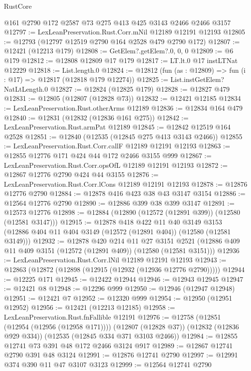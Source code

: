 \begin{lexlean}{RustCore}
\begin{coremodule}
    @161
    @2790
    @172
    @2587
    @73
    @275
    @413
    @425
    @3143
    @2466
    @2466
    @3157
@12797 := LexLeanPreservation.Rust.Corr.mNil @12189 @12191 @12193
@12805 := @12793 (@12797 @12519 @2790 @164 @2528 @479 @2790 @172)
@12807 := @12421 (@12213 @179)
@12808 := GetElem?.getElem?.{0, 0, 0}
@12809 := @6 @179
@12812 := @12808 @12809 @17 @179
@12817 := LT.lt.{0} @17 instLTNat @12229
@12818 := List.length.{0}
@12824 := @12812 (fun (as : @12809) => fun (i : @17) => @12817 (@12818 @179 @12274))
@12825 := List.instGetElem?NatLtLength.{0}
@12827 := @12824 (@12825 @179)
@12828 := @12827 @479
@12831 := @12805 (@12807 (@12828 @73))
@12832 := @12421 @12185
@12834 := LexLeanPreservation.Rust.otherArms @12189
@12836 := @12834 @164 @479
@12840 := @12831 (@12832 (@12836 @161 @275))
@12842 := LexLeanPreservation.Rust.armPat @12189
@12845 := @12842 @12519 @164 @2528
@12851 := @12840 (@12535 (@12845 @275 @413 @3143 @2466))
@12855 := LexLeanPreservation.Rust.Corr.callF @12189 @12191 @12193
@12863 := @12855 @12776 @171 @424 @44 @172 @2466 @3155 @999
@12867 := LexLeanPreservation.Rust.Corr.opsOfL @12189 @12191 @12193
@12872 := @12867 @12776 @2790 @424 @44 @3155
@12876 := LexLeanPreservation.Rust.Corr.lCons @12189 @12191 @12193
@12878 := @12876 @12776 @2790
@12884 := @12878 @416 @423 @38 @43 @3147 @3154
@12886 := @12564 @12776 @2790
@12890 := @12886 @399 @38 @399 @3147
@12891 := @12573 @12776
@12898 := @12884 (@12890 (@12572 (@12891 @399)) (@12580 (@12581 @3147)))
@12915 := @12878
    @418
    @422
    @11
    @40
    @3149
    @3153
    (@12886 @404 @11 @404 @3149 (@12572 (@12891 @404)) (@12580 (@12581 @3149)))
@12932 := @12878
    @420
    @214
    @11
    @27
    @3151
    @2521
    (@12886 @409 @11 @409 @3151 (@12572 (@12891 @409)) (@12580 (@12581 @3151)))
@12936 := LexLeanPreservation.Rust.Corr.lNil @12189 @12191 @12193
@12943 := @12863 (@12872 (@12898 (@12915 (@12932 (@12936 @12776 @2790)))))
@12944 := @12225 @171
@12945 := @12422 @12944
@12946 := @12943 @12945
@12947 := @12421 @8
@12948 := @12296 @999
@12950 := @12946 (@12947 @12948)
@12951 := @12421 @7
@12952 := @12320 @999
@12954 := @12950 (@12951 @12952)
@12956 := @12421 (@12213 @12185)
@12958 := LexLeanPreservation.Rust.fnFallible @12191
@12976 := @12758
    (@12851 (@12954 (@12956 (@12958 @171))))
    (@12807 (@12828 @37))
    (@12832 (@12836 @929 @334))
    (@12535 (@12845 @334 @371 @3103 @2466))
@12984 := @12855 @12741 @73 @391 @48 @172 @2466 @3124 @917
@12989 := @12867 @12741 @2790 @391 @48 @3124
@12991 := @12876 @12741 @2790
@12997 := @12991 @374 @390 @11 @47 @3107 @3123
@12999 := @12564 @12741 @2790

\end{coremodule}
\end{lexlean}
